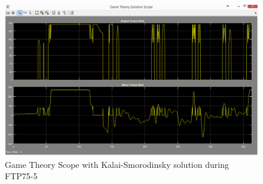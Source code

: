 \begin{figure}[h]
\centering
\includegraphics[scale=0.4]{figures/KalaiSmorodinsky/FTP75-5/gameTheory26Juni}
\caption{Game Theory Scope with Kalai-Smorodinsky solution during FTP75-5}
\label{fig:gtks5}
\end{figure}